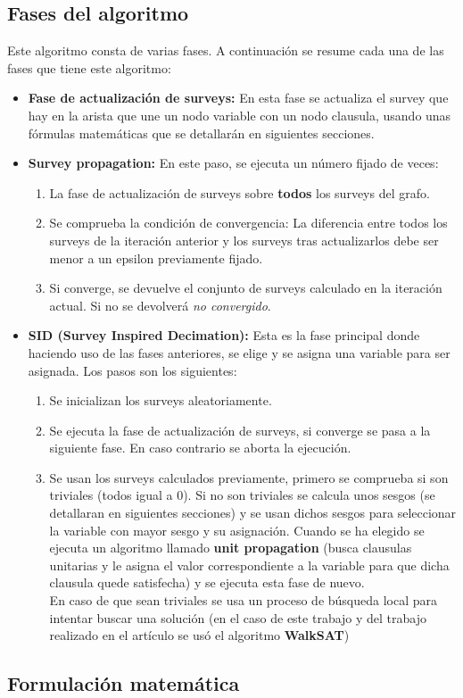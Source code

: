 \subsection{Fases del algoritmo}
Este algoritmo consta de varias fases.
A continuación se resume cada una de las fases que tiene este algoritmo:
\begin{itemize}
	\item \textbf{Fase de actualización de surveys:} En esta fase se actualiza el survey que hay en la arista que une un nodo variable con un nodo clausula, usando unas fórmulas matemáticas que se detallarán en siguientes secciones.
	\item \textbf{Survey propagation:} En este paso, se ejecuta un  número fijado de veces:
	\begin{enumerate}
		\item La fase de actualización de surveys sobre \textbf{todos} los surveys del grafo.
		\item Se comprueba la condición de convergencia: La diferencia entre todos los surveys de la iteración anterior y los surveys tras actualizarlos debe ser menor a un epsilon previamente fijado.  
		\item Si converge, se devuelve el conjunto de surveys calculado en la iteración actual. Si no se devolverá \textit{no convergido}. 
	\end{enumerate} 
	\item \textbf{SID (Survey Inspired Decimation):} Esta es la fase principal donde haciendo uso de las fases anteriores, se elige y se asigna una variable para ser asignada. Los pasos son los siguientes:
	\begin{enumerate}[1º]
		\item Se inicializan los surveys aleatoriamente.
		\item Se ejecuta la fase de actualización de surveys, si converge se pasa a la siguiente fase. En caso contrario se aborta la ejecución.
		\item Se usan los surveys calculados previamente, primero se comprueba si son triviales (todos igual a 0). Si no son triviales se calcula unos sesgos (se detallaran en siguientes secciones) y se usan dichos sesgos para seleccionar la variable con mayor sesgo y su asignación. Cuando se ha elegido se ejecuta un algoritmo llamado \textbf{unit propagation} (busca clausulas unitarias y le asigna el valor correspondiente a la variable para que dicha clausula quede satisfecha) y se ejecuta esta fase de nuevo.\\
		En caso de que sean triviales se usa un proceso de búsqueda local para intentar buscar una solución (en el caso de este trabajo y del trabajo realizado en el artículo se usó el algoritmo \textbf{WalkSAT})
	\end{enumerate}
\end{itemize}
\subsection{Formulación matemática}


